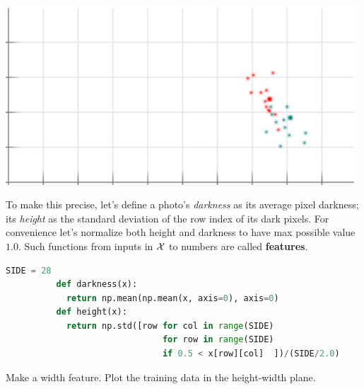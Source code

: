         \begin{marginfigure}
          \centering
          \includegraphics[width=0.99\textwidth]{example-mnist/train-plain}
            \vspace{-0.25cm}
          \caption{
            Our size-$N=25$ set of training examples, viewed in the
            darkness-height plane.  The vertical \emph{darkness} axis ranges
            $[0.0,0.25]$; the horizontal \emph{height} axis ranges $[0.0,0.5]$.
            The origin is at the lower left.  Each {} dot represents a
            $y={\cya{1}}$ example; each {} dot, a $y={\red{9}}$ one.
            The big ${\red{9}}$ above has darkness and height $(0.118, 0.375)$;\
            the big ${\cya{1}}$, $(0.092, 0.404)$.  See where they are in this
            plot?
          }
        \end{marginfigure}

        To make this precise, let's define a photo's \emph{darkness} as its
        average pixel darkness; its \emph{height} as the standard deviation of
        the row index of its dark pixels.  For convenience let's normalize
        both height and darkness to have max possible value $1.0$.  Such
        functions from inputs in $\mathcal{X}$ to numbers are called
        \textbf{features}.

        \begin{lstlisting}[language=Python, basicstyle=\footnotesize\ttfamily]
          SIDE = 28
          def darkness(x):
            return np.mean(np.mean(x, axis=0), axis=0)
          def height(x):
            return np.std([row for col in range(SIDE)
                               for row in range(SIDE)
                               if 0.5 < x[row][col]  ])/(SIDE/2.0)
        \end{lstlisting}
        \par\noindent
         {Make a width feature.  Plot the training data
        in the height-width plane.}

